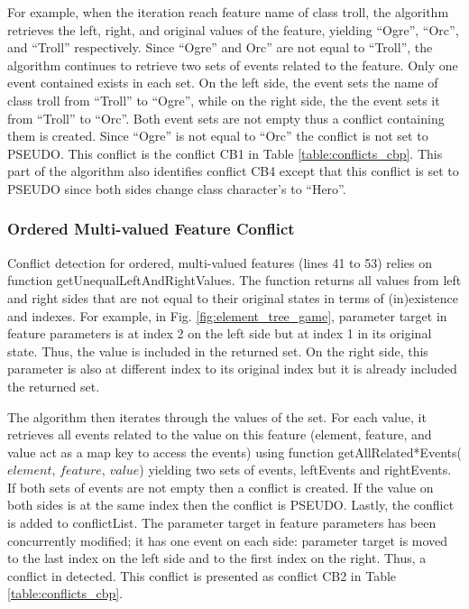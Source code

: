 For example, when the iteration reach feature \textsf{name} of class \textsf{troll}, the algorithm retrieves the left, right, and original values of the feature, yielding ``Ogre'', ``Orc'', and ``Troll'' respectively. Since ``Ogre'' and Orc'' are not equal to ``Troll'', the algorithm continues to retrieve two sets of events related to the feature. Only one event contained exists in each set. On the left side, the event sets the name of class \textsf{troll} from ``Troll'' to ``Ogre'', while on the right side, the the event sets it from ``Troll'' to ``Orc''. Both event sets are not empty thus a conflict containing them is created. Since ``Ogre'' is not equal to ``Orc'' the conflict is not set to \textsf{PSEUDO}. This conflict is the conflict \textsf{CB1} in Table \ref{table:conflicts_cbp}. This part of the algorithm also identifies conflict \textsf{CB4} except that this conflict is set to \textsf{PSEUDO} since both sides change class \textsf{character}'s  to ``Hero''.   

\subsubsection{Ordered Multi-valued Feature Conflict} 
\label{sec:ordered_conflict}
Conflict detection for ordered, multi-valued features (lines 41 to 53) relies on function \textsf{getUnequalLeftAndRightValues}. The function returns all values from left and right sides that are not equal to their original states in terms of (in)existence and indexes. For example, in Fig. \ref{fig:element_tree_game}, parameter \textsf{target} in feature \textsf{parameters} is at index 2 on the left side but at index 1 in its original state. Thus, the value is included in the returned set. On the right side, this parameter is also at different index to its original index but it is already included the returned set. 

The algorithm then iterates through the values of the set. For each value, it retrieves all events related to the value on this feature (element, feature, and value act as a map key to access the events) using function \textsf{getAllRelated*Events($element$, $feature$, $value$)} yielding two sets of events, \textsf{leftEvents} and \textsf{rightEvents}. If both sets of events are not empty then a conflict is created. If the value on both sides is at the same index then the conflict is \textsf{PSEUDO}. Lastly, the conflict is added to \textsf{conflictList}. The parameter \textsf{target} in feature \textsf{parameters} has been concurrently modified; it has one event on each side: parameter \textsf{target} is moved to the last index on the left side and to the first index on the right. Thus, a conflict in detected. This conflict is presented as conflict \textsf{CB2} in Table \ref{table:conflicts_cbp}.


